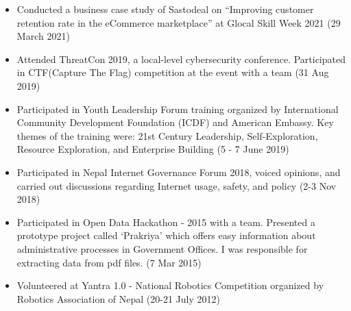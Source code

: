 \documentclass{article}
\begin{document}
\begin{itemize}
    \item Conducted a business case study of Sastodeal on “Improving customer retention rate in the eCommerce marketplace” at Glocal Skill Week 2021 (29 March 2021)
    \item Attended ThreatCon 2019, a local-level cybersecurity conference. Participated in CTF(Capture The Flag) competition at the event with a team (31 Aug 2019)
    \item Participated in Youth Leadership Forum training organized by International Community Development Foundation (ICDF) and American Embassy. Key themes of the training were: 21st Century Leadership, Self-Exploration, Resource Exploration, and Enterprise Building (5 - 7 June 2019)
    \item Participated in Nepal Internet Governance Forum 2018, voiced opinions, and carried out discussions regarding Internet usage, safety, and policy (2-3 Nov 2018)
    \item Participated in Open Data Hackathon - 2015 with a team. Presented a prototype project called ‘Prakriya’ which offers easy information about administrative processes in Government Offices. I was responsible for extracting data from pdf files. (7 Mar 2015)
    \item Volunteered at Yantra 1.0 - National Robotics Competition organized by Robotics Association of Nepal (20-21 July 2012)
\end{itemize}
\end{document}
